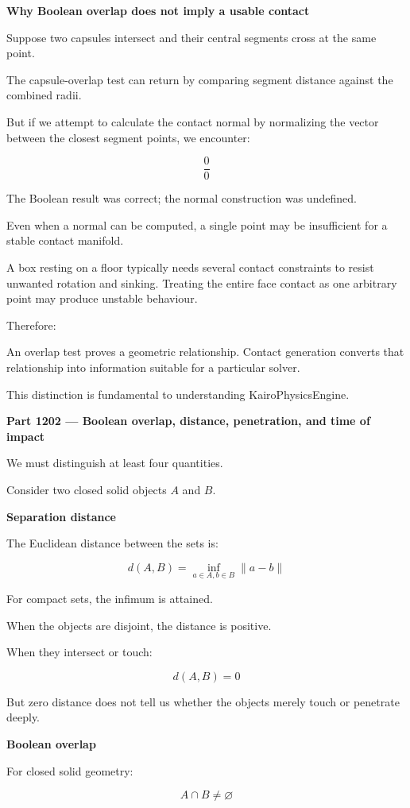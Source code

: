 \textbf{Why Boolean overlap does not imply a usable contact}

Suppose two capsules intersect and their central segments cross at the same point.

The capsule-overlap test can return  by comparing segment distance against the combined radii.

But if we attempt to calculate the contact normal by normalizing the vector between the closest segment points, we encounter:

\[
\frac{0}{0}
\]

The Boolean result was correct; the normal construction was undefined.

Even when a normal can be computed, a single point may be insufficient for a stable contact manifold.

A box resting on a floor typically needs several contact constraints to resist unwanted rotation and sinking. Treating the entire face contact as one arbitrary point may produce unstable behaviour.

Therefore:

An overlap test proves a geometric relationship. Contact generation converts that relationship into information suitable for a particular solver.

This distinction is fundamental to understanding KairoPhysicsEngine.

\textbf{Part 1202 --- Boolean overlap, distance, penetration, and time of impact}

We must distinguish at least four quantities.

Consider two closed solid objects \(A\) and \(B\).

\textbf{Separation distance}

The Euclidean distance between the sets is:

\[
\boxed{ d(A,B)=\inf_{a\in A,b\in B}\|a-b\| }
\]

For compact sets, the infimum is attained.

When the objects are disjoint, the distance is positive.

When they intersect or touch:

\[
d(A,B)=0
\]

But zero distance does not tell us whether the objects merely touch or penetrate deeply.

\textbf{Boolean overlap}

For closed solid geometry:

\[
\boxed{ A\cap B\ne\varnothing }
\]

